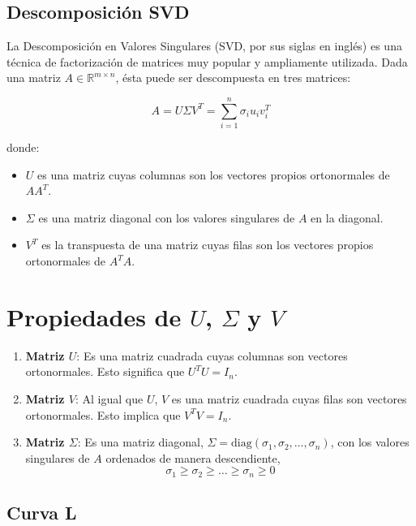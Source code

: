 \documentclass[12pt, oneside]{book}
\begin{document}
	\subsection{Descomposición SVD}
	La Descomposición en Valores Singulares (SVD, por sus siglas en inglés) es una técnica de factorización de matrices muy popular y ampliamente utilizada. Dada una matriz $A \in \mathbb{R}^{m \times n}$, ésta puede ser descompuesta en tres matrices:
	
	\[
	A = U \Sigma V^T = \sum_{i=1}^{n} \sigma_i u_i v_i^T
	\]
	
	donde:
	
	\begin{itemize}
		\item \( U \) es una matriz cuyas columnas son los vectores propios ortonormales de \( A A^T \).
		\item \( \Sigma \) es una matriz diagonal con los valores singulares de \( A \) en la diagonal.
		\item \( V^T \) es la transpuesta de una matriz cuyas filas son los vectores propios ortonormales de \( A^T A \).
	\end{itemize}
	
	\section*{Propiedades de \( U \), \( \Sigma \) y \( V \)}
	
	\begin{enumerate}
		\item \textbf{Matriz \( U \)}: Es una matriz cuadrada cuyas columnas son vectores ortonormales. Esto significa que \( U^T U = I_n \).
		
		\item \textbf{Matriz \( V \)}: Al igual que \( U \), \( V \) es una matriz cuadrada cuyas filas son vectores ortonormales. Esto implica que \( V^T V = I_n \).
		
		\item \textbf{Matriz \( \Sigma \)}: Es una matriz diagonal, $ \Sigma  = \text{diag}(\sigma_1, \sigma_2, \dots, \sigma_n)$, con los valores singulares de $A$ ordenados de manera descendiente,
		\[
		\sigma_1 \geq \sigma_2 \geq \dots \geq \sigma_n \geq 0
		\]
		
	\end{enumerate}
	
	\subsection{Curva L}
	 
	 
\end{document}
